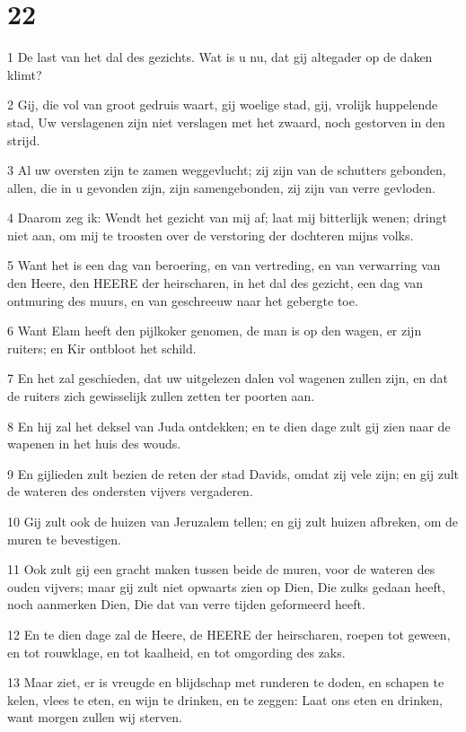 \chapter{22}

\par 1 De last van het dal des gezichts. Wat is u nu, dat gij altegader op de daken klimt?
\par 2 Gij, die vol van groot gedruis waart, gij woelige stad, gij, vrolijk huppelende stad, Uw verslagenen zijn niet verslagen met het zwaard, noch gestorven in den strijd.
\par 3 Al uw oversten zijn te zamen weggevlucht; zij zijn van de schutters gebonden, allen, die in u gevonden zijn, zijn samengebonden, zij zijn van verre gevloden.
\par 4 Daarom zeg ik: Wendt het gezicht van mij af; laat mij bitterlijk wenen; dringt niet aan, om mij te troosten over de verstoring der dochteren mijns volks.
\par 5 Want het is een dag van beroering, en van vertreding, en van verwarring van den Heere, den HEERE der heirscharen, in het dal des gezicht, een dag van ontmuring des muurs, en van geschreeuw naar het gebergte toe.
\par 6 Want Elam heeft den pijlkoker genomen, de man is op den wagen, er zijn ruiters; en Kir ontbloot het schild.
\par 7 En het zal geschieden, dat uw uitgelezen dalen vol wagenen zullen zijn, en dat de ruiters zich gewisselijk zullen zetten ter poorten aan.
\par 8 En hij zal het deksel van Juda ontdekken; en te dien dage zult gij zien naar de wapenen in het huis des wouds.
\par 9 En gijlieden zult bezien de reten der stad Davids, omdat zij vele zijn; en gij zult de wateren des ondersten vijvers vergaderen.
\par 10 Gij zult ook de huizen van Jeruzalem tellen; en gij zult huizen afbreken, om de muren te bevestigen.
\par 11 Ook zult gij een gracht maken tussen beide de muren, voor de wateren des ouden vijvers; maar gij zult niet opwaarts zien op Dien, Die zulks gedaan heeft, noch aanmerken Dien, Die dat van verre tijden geformeerd heeft.
\par 12 En te dien dage zal de Heere, de HEERE der heirscharen, roepen tot geween, en tot rouwklage, en tot kaalheid, en tot omgording des zaks.
\par 13 Maar ziet, er is vreugde en blijdschap met runderen te doden, en schapen te kelen, vlees te eten, en wijn te drinken, en te zeggen: Laat ons eten en drinken, want morgen zullen wij sterven.
